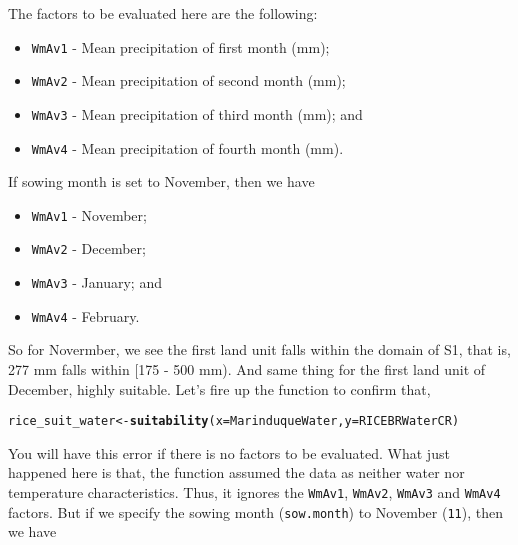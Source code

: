 \documentclass[11pt,fleqn]{article}\usepackage[]{graphicx}\usepackage[]{color}
\makeatletter
\newcommand{\hlstd}[1]{\textcolor[rgb]{0.345,0.345,0.345}{#1}}%
\newcommand{\hlkwb}[1]{\textcolor[rgb]{0.69,0.353,0.396}{#1}}%
\newcommand{\hlkwc}[1]{\textcolor[rgb]{0.333,0.667,0.333}{#1}}%
\newcommand{\hlkwd}[1]{\textcolor[rgb]{0.737,0.353,0.396}{\textbf{#1}}}%
\newenvironment{kframe}{%
 \def\at@end@of@kframe{}%
 \ifinner\ifhmode%
  \def\at@end@of@kframe{\end{minipage}}%
  \begin{minipage}{\columnwidth}%
 \fi\fi%
 \def\FrameCommand##1{\hskip\@totalleftmargin \hskip-\fboxsep
 \colorbox{shadecolor}{##1}\hskip-\fboxsep
     \hskip-\linewidth \hskip-\@totalleftmargin \hskip\columnwidth}%
 \MakeFramed {\advance\hsize-\width
   \@totalleftmargin\z@ \linewidth\hsize
   \@setminipage}}%
 {\par\unskip\endMakeFramed%
 \at@end@of@kframe}
\newenvironment{knitrout}{}{} %
\makeatother
\begin{document}
\noindent The factors to be evaluated here are the following:
\begin{itemize}
\item \verb|WmAv1| - Mean precipitation of first month (mm);
\item \verb|WmAv2| - Mean precipitation of second month (mm);
\item \verb|WmAv3| - Mean precipitation of third month (mm); and
\item \verb|WmAv4| - Mean precipitation of fourth month (mm).
\end{itemize}
If sowing month is set to November, then we have
\begin{itemize}
\item \verb|WmAv1| - November;
\item \verb|WmAv2| - December;
\item \verb|WmAv3| - January; and
\item \verb|WmAv4| - February.
\end{itemize}
So for Novermber, we see the first land unit falls within the domain of S1, that is, 277 mm falls within [175 - 500 mm). And same thing for the first land unit of December, highly suitable. Let's fire up the function to confirm that,
\begin{knitrout}
\color{fgcolor}\begin{kframe}
\begin{alltt}
\hlstd{rice_suit_water} \hlkwb{<-} \hlkwd{suitability}\hlstd{(}\hlkwc{x} \hlstd{= MarinduqueWater,} \hlkwc{y} \hlstd{= RICEBRWaterCR)}
\end{alltt}


{\ttfamily\noindent\color{warningcolor}{\#\# Warning: For water characteristic, make sure to input sowing month (sow.month), say 1, w/c implies January}}

{\ttfamily\noindent\bfseries\color{errorcolor}{\#\# Error: No factor(s) to be evaluated, since none matches with the crop requirements.}}\end{kframe}
\end{knitrout}
You will have this error if there is no factors to be evaluated. What just happened here is that, the function assumed the data as neither water nor temperature characteristics. Thus, it ignores the \verb|WmAv1|, \verb|WmAv2|, \verb|WmAv3| and \verb|WmAv4| factors. But if we specify the sowing month (\verb|sow.month|) to November (\verb|11|), then we have
\end{document}
